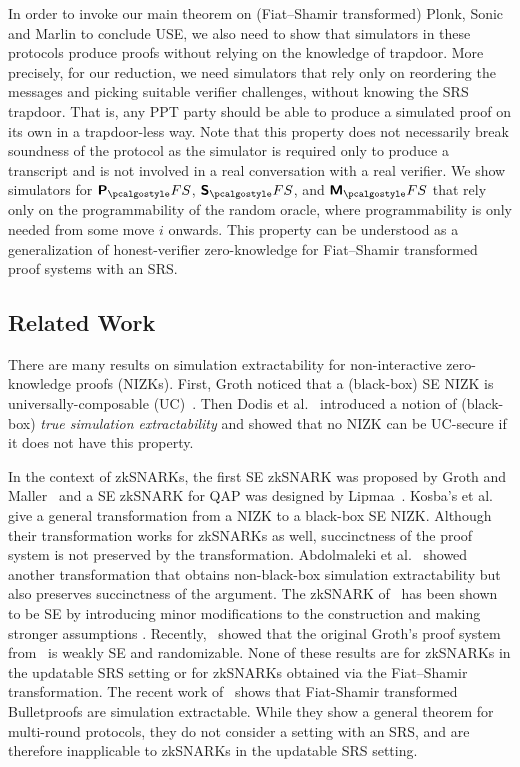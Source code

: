   In order to invoke our main theorem
on (Fiat--Shamir transformed) Plonk, Sonic and Marlin to conclude USE, we also need
to show that simulators in these protocols produce proofs without relying on the
knowledge of trapdoor. More precisely, for our reduction, we need simulators that rely
only on reordering the messages and picking suitable verifier challenges, without
knowing the SRS trapdoor.  That is, any PPT party should be able to produce a
simulated proof on its own in a trapdoor-less way. Note that this property does not
necessarily break soundness of the protocol as the simulator is required only to
produce a transcript and is not involved in a real conversation with a real
verifier. We show simulators for $\plonkprotfs$, $\sonicprotfs$, and $\marlinprotfs$
that rely only on the programmability of the random oracle, where programmability is only needed
from some move $i$ onwards. This property can be understood as a generalization of
honest-verifier zero-knowledge for Fiat--Shamir transformed proof systems with an
SRS.

\subsection{Related Work}
There are many results on simulation extractability for
non-interactive zero-knowledge proofs (NIZKs). First, Groth \cite{AC:Groth07}
noticed that a (black-box) SE NIZK is
universally-composable (UC)~\cite{EPRINT:Canetti00}. Then Dodis et al.~\cite{AC:DHLW10} introduced a
notion of (black-box) \emph{true simulation extractability} and showed that no
NIZK can be UC-secure if it does not have this property. 

In the context of zkSNARKs, the first
SE zkSNARK was proposed by Groth and Maller~\cite{C:GroMal17} and a SE
zkSNARK for QAP was designed by Lipmaa~\cite{EPRINT:Lipmaa19a}.
Kosba's et
al.~\cite{EPRINT:KZMQCP15} give a general transformation from a NIZK to a
black-box SE NIZK. Although their transformation works for zkSNARKs as well,
succinctness of the proof system is not preserved by the transformation.
Abdolmaleki et al.~\cite{CCS:AbdRamSla20} showed another transformation that
obtains non-black-box simulation extractability but also preserves
succinctness of the argument. 
The zkSNARK of~\cite{EC:Groth16} has been shown to be SE by introducing minor modifications to the construction and making
stronger assumptions \cite{EPRINT:BowGab18,EPRINT:AtaBag19}. Recently,~\cite{EPRINT:BKSV20} showed that the
original Groth's proof system from~\cite{EC:Groth16} is weakly SE and
randomizable. None of these results are for zkSNARKs in the updatable SRS setting or for zkSNARKs obtained via the Fiat--Shamir transformation. The recent work of~\cite{EC:GOPTT22} shows that Fiat-Shamir transformed Bulletproofs are simulation extractable. While they show a general theorem for multi-round protocols, they do not consider a setting with an SRS, and are therefore inapplicable to zkSNARKs in the updatable SRS setting.

